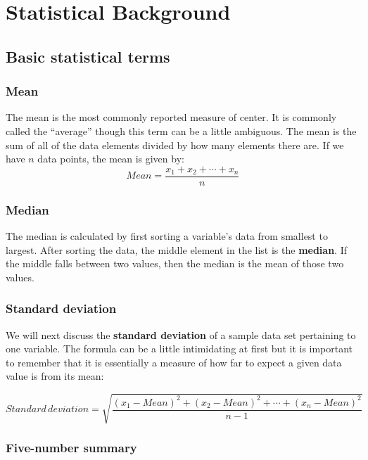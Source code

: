 \documentclass[]{tufte-book}
\begin{document}
\appendix


\chapter{Statistical Background}\label{appendixA}

\section{Basic statistical terms}\label{basic-statistical-terms}

\subsection{Mean}\label{mean}

The mean is the most commonly reported measure of center. It is commonly
called the ``average'' though this term can be a little ambiguous. The
mean is the sum of all of the data elements divided by how many elements
there are. If we have \(n\) data points, the mean is given by:
\[Mean = \frac{x_1 + x_2 + \cdots + x_n}{n}\]

\subsection{Median}\label{median}

The median is calculated by first sorting a variable's data from
smallest to largest. After sorting the data, the middle element in the
list is the \textbf{median}. If the middle falls between two values,
then the median is the mean of those two values.

\subsection{Standard deviation}\label{standard-deviation}

We will next discuss the \textbf{standard deviation} of a sample data
set pertaining to one variable. The formula can be a little intimidating
at first but it is important to remember that it is essentially a
measure of how far to expect a given data value is from its mean:

\[Standard \, deviation = \sqrt{\frac{(x_1 - Mean)^2 + (x_2 - Mean)^2 + \cdots + (x_n - Mean)^2}{n - 1}}\]

\subsection{Five-number summary}\label{five-number-summary}
\end{document}
